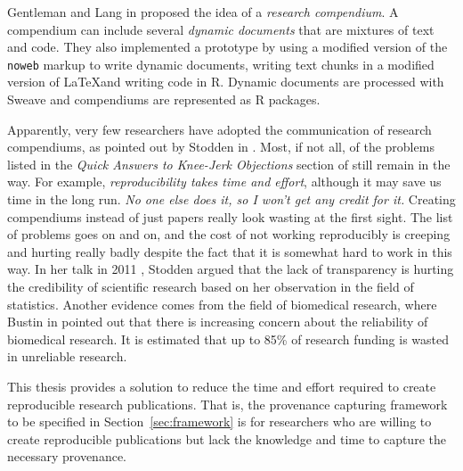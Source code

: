 Gentleman and Lang in \cite{gentleman2007statistical} proposed the idea of a \emph{research compendium}. A compendium can include several \emph{dynamic documents} that are mixtures of text and code. They also implemented a prototype by using a modified version of the \texttt{noweb} markup \cite{ramsey1994literate} to write dynamic documents, writing text chunks in a modified version of \LaTeX and writing code in R. Dynamic documents are processed with Sweave \cite{leisch2002sweave} and compendiums are represented as R packages.

Apparently, very few researchers have adopted the communication of research compendiums, as pointed out by Stodden in \cite{stodden2014enabling}. Most, if not all, of the problems listed in the \emph{Quick Answers to Knee-Jerk Objections} section of \cite{donoho2009reproducible} still remain in the way. For example, \emph{reproducibility takes time and effort}, although it may save us time in the long run. \emph{No one else does it, so I won't get any credit for it.} Creating compendiums instead of just papers really look wasting at the first sight. The list of problems goes on and on, and the cost of not working reproducibly is creeping and hurting really badly despite the fact that it is somewhat hard to work in this way. In her talk in 2011 \cite{stodden2011establishing}, Stodden argued that the lack of transparency is hurting the credibility of scientific research based on her observation in the field of statistics. Another evidence comes from the field of biomedical research, where Bustin in \cite{bustin2015reproducibility} pointed out that there is increasing concern about the reliability of biomedical research. It is estimated that up to 85\% of research funding is wasted in unreliable research.

This thesis provides a solution to reduce the time and effort required to create reproducible research publications. That is, the provenance capturing framework to be specified in Section~\ref{sec:framework} is for researchers who are willing to create reproducible publications but lack the knowledge and time to capture the necessary provenance.



